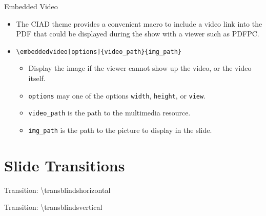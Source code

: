 \documentclass[english,sectioncirclenumberstyle]{ciadbeamer}
\begin{document}
\begin{frame}{Embedded Video}
	\begin{itemize}
	\item The CIAD theme provides a convenient macro to include a video link into the PDF that could be displayed during the show with a viewer such as PDFPC.
	\item \texttt{{\textbackslash}embeddedvideo[options]\{video\_path\}\{img\_path\}}
		\begin{itemize}
		\item Display the image if the viewer cannot show up the video, or the video itself.
		\item \texttt{options} may one of the options \texttt{width}, \texttt{height}, or \texttt{view}.
		\item \texttt{video\_path} is the path to the multimedia resource.
		\item \texttt{img\_path} is the path to the picture to display in the slide.
		\end{itemize}
	\end{itemize}
\end{frame}

\section{Slide Transitions}
\tableofcontentslide[sectionstyle={show/shaded},subsectionstyle={show/show/hide},subsubsectionstyle={hide/hide/hide/hide},sections={3-}]


\begin{frame}[c]{Transition: {\textbackslash}transblindshorizontal}
	\transblindshorizontal
	\begin{center}
	\end{center}
\end{frame}

\begin{frame}[c]{Transition: {\textbackslash}transblindsvertical}
	\transblindsvertical
	\begin{center}
	\end{center}
\end{frame}
\end{document}

